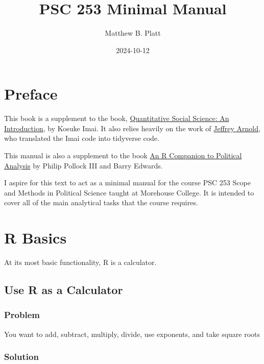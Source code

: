 \documentclass[
]{book}
\title{PSC 253 Minimal Manual}
\author{Matthew B. Platt}
\date{2024-10-12}
\begin{document}
\maketitle

{
\setcounter{tocdepth}{1}
\tableofcontents
}
\hypertarget{preface}{%
\chapter*{Preface}\label{preface}}

This book is a supplement to the book, \href{http://qss.princeton.press/}{Quantitative Social Science: An Introduction}, by Kosuke Imai. It also relies heavily on the work of \href{https://jrnold.github.io/qss-tidy/}{Jeffrey Arnold}, who translated the Imai code into tidyverse code.

This manual is also a supplement to the book \href{https://us.sagepub.com/en-us/nam/an-r-companion-to-political-analysis/book244716}{An R Companion to Political Analysis} by Philip Pollock III and Barry Edwards.

I aspire for this text to act as a minimal manual for the course PSC 253 Scope and Methods in Political Science taught at Morehouse College. It is intended to cover all of the main analytical tasks that the course requires.

\hypertarget{basic}{%
\chapter{R Basics}\label{basic}}

At its most basic functionality, R is a calculator.

\hypertarget{calculate}{%
\section{Use R as a Calculator}\label{calculate}}

\hypertarget{problem}{%
\subsection{Problem}\label{problem}}

You want to add, subtract, multiply, divide, use exponents, and take square roots

\hypertarget{solution}{%
\subsection{Solution}\label{solution}}
\end{document}
